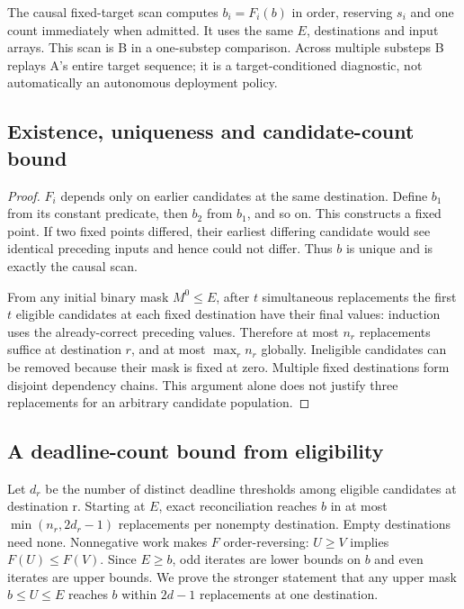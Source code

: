 \documentclass[12pt,a4paper]{article}
\begin{document}
The causal fixed-target scan computes $b_i=F_i(b)$ in order, reserving $s_i$ and one count immediately when admitted. It uses the same $E$, destinations and input arrays. This scan is B in a one-substep comparison. Across multiple substeps B replays A's entire target sequence; it is a target-conditioned diagnostic, not automatically an autonomous deployment policy.

\FloatBarrier
\subsection{Existence, uniqueness and candidate-count bound}\label{sec:C.2}

\begin{proof}

$F_i$ depends only on earlier candidates at the same destination. Define $b_1$ from its constant predicate, then $b_2$ from $b_1$, and so on. This constructs a fixed point. If two fixed points differed, their earliest differing candidate would see identical preceding inputs and hence could not differ. Thus $b$ is unique and is exactly the causal scan.

From any initial binary mask $M^0\leq E$, after $t$ simultaneous replacements the first $t$ eligible candidates at each fixed destination have their final values: induction uses the already-correct preceding values. Therefore at most $n_r$ replacements suffice at destination $r$, and at most $\max_r n_r$ globally. Ineligible candidates can be removed because their mask is fixed at zero. Multiple fixed destinations form disjoint dependency chains. This argument alone does not justify three replacements for an arbitrary candidate population.

\end{proof}

\FloatBarrier
\subsection{A deadline-count bound from eligibility}\label{sec:C.3}

Let $d_r$ be the number of distinct deadline thresholds among eligible candidates at destination r. Starting at $E$, exact reconciliation reaches $b$ in at most $\min(n_r,2d_r-1)$ replacements per nonempty destination. Empty destinations need none. Nonnegative work makes $F$ order-reversing: $U\geq V$ implies $F(U)\leq F(V)$. Since $E\geq b$, odd iterates are lower bounds on $b$ and even iterates are upper bounds. We prove the stronger statement that any upper mask $b\leq U\leq E$ reaches $b$ within $2d-1$ replacements at one destination.
\end{document}
